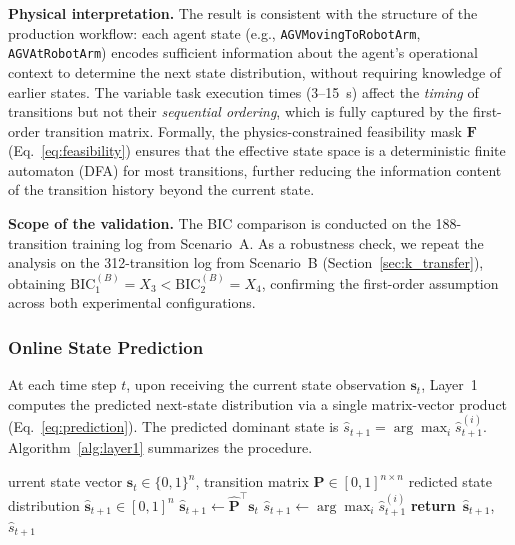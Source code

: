 \documentclass[manuscript,screen,review]{acmart}
\providecommand{\REQUIRE}[1]{\Require{#1}}
\providecommand{\ENSURE}[1]{\Ensure{#1}}
\providecommand{\STATE}{\State}
\providecommand{\RETURN}{\State\textbf{return}~}
\begin{document}
\begin{remark}
\textbf{Physical interpretation.}
The result is consistent with the structure of the
production workflow: each agent state (e.g.,
\texttt{AGVMovingToRobotArm}, \texttt{AGVAtRobotArm})
encodes sufficient information about the agent's
operational context to determine the next state
distribution, without requiring knowledge of earlier
states. The variable task execution times (3--15~s)
affect the \emph{timing} of transitions but not their
\emph{sequential ordering}, which is fully captured
by the first-order transition matrix. Formally, the
physics-constrained feasibility mask $\mathbf{F}$
(Eq.~\eqref{eq:feasibility}) ensures that the
effective state space is a deterministic finite
automaton (DFA) for most transitions, further
reducing the information content of the transition
history beyond the current state.

\textbf{Scope of the validation.}
The BIC comparison is conducted on the 188-transition
training log from Scenario~A. As a robustness check,
we repeat the analysis on the 312-transition log from
Scenario~B (Section~\ref{sec:k_transfer}), obtaining
$\mathrm{BIC}_1^{(B)} = X_3 < \mathrm{BIC}_2^{(B)} = X_4$,
confirming the first-order assumption across both
experimental configurations.
\end{remark}


\subsubsection{Online State Prediction}

At each time step $t$, upon receiving the current state
observation $\mathbf{s}_t$, Layer~1 computes the predicted
next-state distribution via a single matrix-vector product
(Eq.~\eqref{eq:prediction}). The predicted dominant state
is $\hat{s}_{t+1} = \arg\max_i \hat{s}_{t+1}^{(i)}$.
Algorithm~\ref{alg:layer1} summarizes the procedure.

\begin{algorithm}[!t]
\caption{Layer 1: Markov State Prediction}
\label{alg:layer1}
\begin{algorithmic}[1]
\REQUIRE Current state vector $\mathbf{s}_t \in \{0,1\}^n$,
         transition matrix $\hat{\mathbf{P}} \in [0,1]^{n\times n}$
\ENSURE  Predicted state distribution
         $\hat{\mathbf{s}}_{t+1} \in [0,1]^n$
\STATE $\hat{\mathbf{s}}_{t+1} \leftarrow
       \hat{\mathbf{P}}^{\top} \mathbf{s}_t$
\STATE $\hat{s}_{t+1} \leftarrow
       \arg\max_{i} \hat{s}_{t+1}^{(i)}$
\RETURN $\hat{\mathbf{s}}_{t+1}$, $\hat{s}_{t+1}$
\end{algorithmic}
\end{algorithm}
\end{document}
